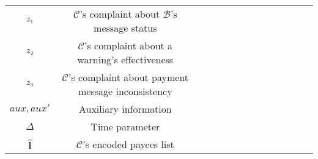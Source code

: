 \begin{table}[!htbp]
\begin{scriptsize}
\begin{center}
{{\begin{tabular}{|c|c|c|c|c|c|c|c|c|c|c|c|c|c|}
%
\cellcolor{white!20}\scriptsize$z_{\scriptscriptstyle 1}$ &\cellcolor{white!20}\scriptsize  $\mathcal{C}$'s complaint about $\mathcal{B}$'s message status\\ 
% 
\cellcolor{white!20}\scriptsize$z_{\scriptscriptstyle 2}$ &\cellcolor{white!20}\scriptsize  $\mathcal{C}$'s complaint about a warning's effectiveness\\
%
\cellcolor{gray!20}\scriptsize$z_{\scriptscriptstyle 3}$ &\cellcolor{gray!20}\scriptsize  $\mathcal{C}$'s complaint about payment message  inconsistency\\ 
%
\cellcolor{gray!20}\scriptsize$aux, aux'$ &\cellcolor{gray!20}\scriptsize  Auxiliary information\\ 
%
%
\cellcolor{white!20}\scriptsize$\Delta$ &\cellcolor{white!20}\scriptsize  Time parameter \\ 

%


%

%
\cellcolor{gray!20}\scriptsize$\hat{\bm{l}}$ &\cellcolor{gray!20}\scriptsize  $\mathcal{C}$'s encoded payees list\\ 
%



\end{tabular}}}
\end{center}
\end{scriptsize}
\end{table}
